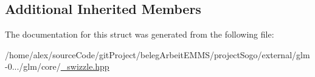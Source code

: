 \subsection*{Additional Inherited Members}


The documentation for this struct was generated from the following file\-:\begin{DoxyCompactItemize}
\item 
/home/alex/source\-Code/git\-Project/beleg\-Arbeit\-E\-M\-M\-S/project\-Sogo/external/glm-\/0.../glm/core/\hyperlink{__swizzle_8hpp}{\-\_\-swizzle.\-hpp}\end{DoxyCompactItemize}
